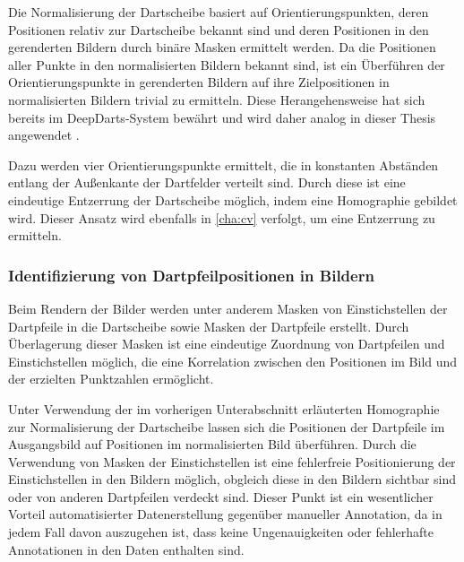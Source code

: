 Die Normalisierung der Dartscheibe basiert auf Orientierungspunkten, deren Positionen relativ zur Dartscheibe bekannt sind und deren Positionen in den gerenderten Bildern durch binäre Masken ermittelt werden. Da die Positionen aller Punkte in den normalisierten Bildern bekannt sind, ist ein Überführen der Orientierungspunkte in gerenderten Bildern auf ihre Zielpositionen in normalisierten Bildern trivial zu ermitteln. Diese Herangehensweise hat sich bereits im DeepDarts-System bewährt und wird daher analog in dieser Thesis angewendet \cite{deepdarts}.

Dazu werden vier Orientierungspunkte ermittelt, die in konstanten Abständen entlang der Außenkante der Dartfelder verteilt sind. Durch diese ist eine eindeutige Entzerrung der Dartscheibe möglich, indem eine Homographie gebildet wird. Dieser Ansatz wird ebenfalls in \autoref{cha:cv} verfolgt, um eine Entzerrung zu ermitteln.

\subsubsection{Identifizierung von Dartpfeilpositionen in Bildern}

Beim Rendern der Bilder werden unter anderem Masken von Einstichstellen der Dartpfeile in die Dartscheibe sowie Masken der Dartpfeile erstellt. Durch Überlagerung dieser Masken ist eine eindeutige Zuordnung von Dartpfeilen und Einstichstellen möglich, die eine Korrelation zwischen den Positionen im Bild und der erzielten Punktzahlen ermöglicht. %

Unter Verwendung der im vorherigen Unterabschnitt erläuterten Homographie zur Normalisierung der Dartscheibe lassen sich die Positionen der Dartpfeile im Ausgangsbild auf Positionen im normalisierten Bild überführen. Durch die Verwendung von Masken der Einstichstellen ist eine fehlerfreie Positionierung der Einstichstellen in den Bildern möglich, obgleich diese in den Bildern sichtbar sind oder von anderen Dartpfeilen verdeckt sind. Dieser Punkt ist ein wesentlicher Vorteil automatisierter Datenerstellung gegenüber manueller Annotation, da in jedem Fall davon auszugehen ist, dass keine Ungenauigkeiten oder fehlerhafte Annotationen in den Daten enthalten sind.

